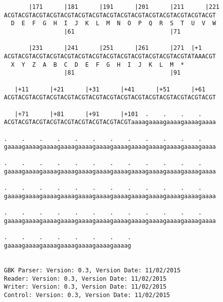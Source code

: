\documentclass{article}
\begin{document}
\begin{Verbatim}
       |171      |181      |191      |201      |211      |221
ACGTACGTACGTACGTACGTACGTACGTACGTACGTACGTACGTACGTACGTACGTACGT
  D  E  F  G  H  I  J  K  L  M  N  O  P  Q  R  S  T  U  V  W
                 |61                           |71          
  
       |231      |241      |251      |261      |271  |+1    
ACGTACGTACGTACGTACGTACGTACGTACGTACGTACGTACGTACGTACGTATAAACGT
  X  Y  Z  A  B  C  D  E  F  G  H  I  J  K  L  M  *   
                 |81                           |91          
  
   |+11      |+21      |+31      |+41      |+51      |+61   
ACGTACGTACGTACGTACGTACGTACGTACGTACGTACGTACGTACGTACGTACGTACGT
                                                            
   |+71      |+81      |+91      |+101  .    .    .    .    
ACGTACGTACGTACGTACGTACGTACGTACGTACGTaaaagaaaagaaaagaaaagaaaa
                                                            
.    .    .    .    .    .    .    .    .    .    .    .    
gaaaagaaaagaaaagaaaagaaaagaaaagaaaagaaaagaaaagaaaagaaaagaaaa
                                                            
.    .    .    .    .    .    .    .    .    .    .    .    
gaaaagaaaagaaaagaaaagaaaagaaaagaaaagaaaagaaaagaaaagaaaagaaaa
                                                            
.    .    .    .    .    .    .    .    .    .    .    .    
gaaaagaaaagaaaagaaaagaaaagaaaagaaaagaaaagaaaagaaaagaaaagaaaa
                                                            
.    .    .    .    .    .    .    .    .    .    .    .    
gaaaagaaaagaaaagaaaagaaaagaaaagaaaagaaaagaaaagaaaagaaaagaaaa
                                                            
.    .    .    .    .    .    .    .
gaaaagaaaagaaaagaaaagaaaagaaaagaaaag
                                    
                                    
GBK Parser: Version: 0.3, Version Date: 11/02/2015
Reader: Version: 0.3, Version Date: 11/02/2015
Writer: Version: 0.3, Version Date: 11/02/2015
Control: Version: 0.3, Version Date: 11/02/2015
\end{Verbatim}
\end{document}
